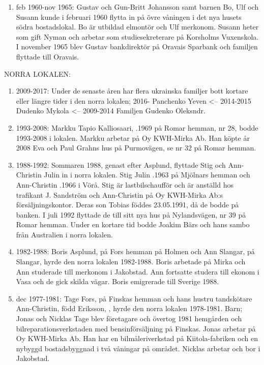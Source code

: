 \begin{enumerate}
  \item feb 1960-nov 1965: Gustav och Gun-Britt Johansson samt barnen Bo, Ulf och Susann kunde i februari 1960 flytta in på övre våningen i det nya husets södra bostadslokal. Bo är utbildad elmontör och Ulf merkonom. Susann heter som gift Nyman och arbetar som studiesekreterare på Korsholms Vuxenskola. I november 1965 blev Gustav bankdirektör på Oravais Sparbank och familjen flyttade till Oravais.
\end{enumerate}

NORRA LOKALEN:
\begin{enumerate}
  \item 2009-2017: Under de senaste åren har flera ukrainska familjer bott kortare eller längre tider i den norra lokalen; 2016-	Panchenko Yeven <-- 2014-2015	Dudenko Mykola <-- 2009-2014	Familjen Gudenko Oleksndr.
  \item 1993-2008: Markku Tapio Kalliosaari, .1969 på Romar hemman, nr 28, bodde 1993-2008 i lokalen. Markku arbetar på Oy KWH-Mirka Ab. Han köpte år 2008 Eva och Paul Grahns hus på Purmovägen, se nr 32 på Romar hemman.
  \item 1988-1992: Sommaren 1988, genast efter Asplund, flyttade Stig och Ann-Christin Julin in i norra lokalen. Stig Julin .1963 på Mjölnars hemman och Ann-Christin .1966 i Vörå. Stig är lastbilschaufför och är anställd hos trafikant J. Sandström och Ann-Christin på Oy KWH-Mirka Ab:s försäljningskontor. Deras son Tobias föddes 23.05.1991, då de bodde på banken. I juli 1992 flyttade de till sitt nya hus på Nylandsvägen, nr 39 på Romar hemman.
  Under en kortare tid bodde Joakim Bärs och hans sambo från Australien i norra lokalen.
  \item 1982-1988: Boris Asplund,  på Fors hemman på Holmen och Ann Slangar,  på Slangar, hyrde den norra lokalen 1982-1988. Boris arbetade på Mirka och Ann studerade till merkonom i Jakobstad. Ann fortsatte studera till ekonom i Vasa och de gick skilda vägar. Boris emigrerade till Sverige 1988.
  \item dec 1977-1981: 	Tage Fors,  på Finskas hemman och hans hustru tandskötare Ann-Christin, född Eriksson, , hyrde den norra lokalen 1978-1981. Barn;	Jonas	 och	Nicklas		Tage blev företagare och övertog 1981 hemgården och bilreparationsverkstaden med bensinförsäljning på Finskas. Jonas arbetar på Oy KWH-Mirka Ab. Han har en bilmåleriverkstad på Kiitola-fabriken och en nybyggd bostadsbyggnad i två våningar på området. Nicklas arbetar och bor i Jakobstad.

\end{enumerate}
